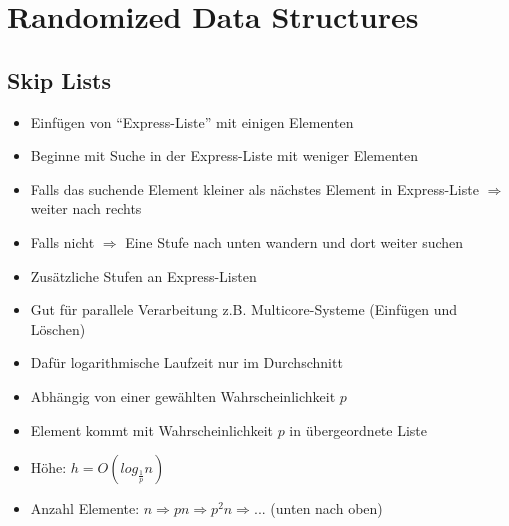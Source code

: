 \documentclass[
    ngerman,
    color=3b,
    load_common, %
    summary,
    boxarc,
]{tuda_summary}
\begin{document}
\section{Randomized Data Structures}\label{Randomized Data Structures}
\subsection{Skip Lists}\label{Skip Lists}
\begin{idea}\mbox{}
    \begin{itemize}
        \item Einfügen von "`Express-Liste"' mit einigen Elementen
        \item Beginne mit Suche in der Express-Liste mit weniger Elementen
        \item Falls das suchende Element kleiner als nächstes Element in Express-Liste $\Rightarrow$ weiter nach rechts
        \item Falls nicht $\Rightarrow$ Eine Stufe nach unten wandern und dort weiter suchen
    \end{itemize}
\end{idea}

\begin{description}[itemsep=1em]
    \item [Mögliche Verbesserung] \begin{itemize}
              \item Zusätzliche Stufen an Express-Listen
          \end{itemize}
    \item [Anwendung]
          \begin{itemize}
              \item Gut für parallele Verarbeitung z.B. Multicore-Systeme (Einfügen und Löschen)
              \item Dafür logarithmische Laufzeit nur im Durchschnitt
          \end{itemize}
    \item [Auswahl von Elementen]
          \begin{itemize}
              \item Abhängig von einer gewählten Wahrscheinlichkeit $p$
              \item Element kommt mit Wahrscheinlichkeit $p$ in übergeordnete Liste
              \item Höhe: $h = O(log_{\frac{1}{p}}n)$
              \item Anzahl Elemente: $n \Rightarrow pn \Rightarrow p^2n \Rightarrow ...$ (unten nach oben)
          \end{itemize}
\end{description}
\end{document}
